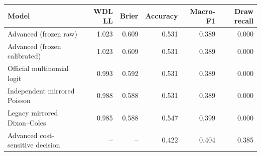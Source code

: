 \begin{tabularx}{\linewidth}{@{}Yrrrrr@{}}
\toprule
Model & WDL LL & Brier & Accuracy & Macro-F1 & Draw recall \\
\midrule
Advanced (frozen raw) & 1.023 & 0.609 & 0.531 & 0.389 & 0.000 \\
Advanced (frozen calibrated) & 1.023 & 0.609 & 0.531 & 0.389 & 0.000 \\
Official multinomial logit & 0.993 & 0.592 & 0.531 & 0.389 & 0.000 \\
Independent mirrored Poisson & 0.988 & 0.588 & 0.531 & 0.389 & 0.000 \\
Legacy mirrored Dixon--Coles & 0.985 & 0.588 & 0.547 & 0.399 & 0.000 \\
Advanced cost-sensitive decision & -- & -- & 0.422 & 0.404 & 0.385 \\
\bottomrule
\end{tabularx}
